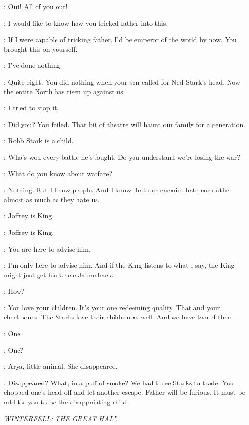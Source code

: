 \CERSEI: Out! All of you out!


\CERSEI: I would like to know how you tricked father into this.

\TYRION: If I were capable of tricking father, I'd be emperor of the world by now. You brought this on yourself.

\CERSEI: I've done nothing.

\TYRION: Quite right. You did nothing when your son called for Ned Stark's head. Now the entire North has risen up against us.

\CERSEI: I tried to stop it.

\TYRION: Did you? You failed. That bit of theatre will haunt our family for a generation.

\CERSEI: Robb Stark is a child.

\TYRION: Who's won every battle he's fought. Do you understand we're losing the war?

\CERSEI: What do you know about warfare?

\TYRION: Nothing. But I know people. And I know that our enemies hate each other almost as much as they hate us.

\CERSEI: Joffrey is King.

\TYRION: Joffrey is King.

\CERSEI: You are here to advise him.

\TYRION: I'm only here to advise him. And if the King listens to what I say, the King might just get his Uncle Jaime back.

\CERSEI: How?

\TYRION: You love your children. It's your one redeeming quality. That and your cheekbones. The Starks love their children as well. And we have two of them.

\CERSEI: One.

\TYRION: One?

\CERSEI: Arya, little animal. She disappeared.

\TYRION: Disappeared? What, in a puff of smoke? We had three Starks to trade. You chopped one's head off and let another escape. Father will be furious. It must be odd for you to be the disappointing child.


\scene

\textit{WINTERFELL: THE GREAT HALL}


